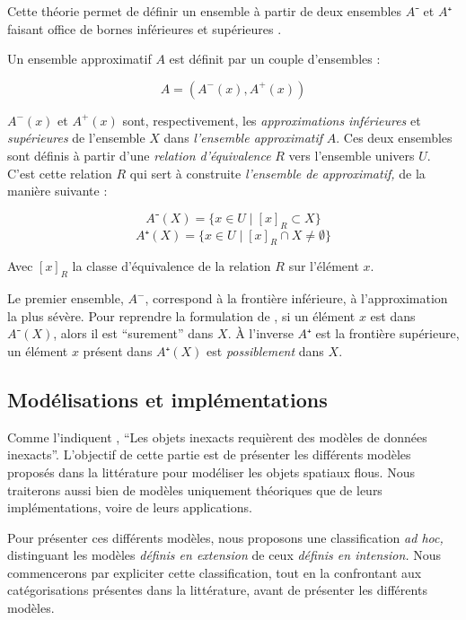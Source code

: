 Cette théorie permet de définir un ensemble à partir de deux ensembles
$A⁻$ et $A⁺$ faisant office de bornes inférieures et supérieures
\autocite{Gacogne1997}.

Un ensemble approximatif $A$ est définit par un couple d'ensembles :

\begin{equation}
  A = (A^-(x),A^+(x))  
\end{equation}

$A^-(x)$ et $A^+(x)$ sont, respectivement, les \emph{approximations}
\emph{inférieures} et \emph{supérieures} de l'ensemble $X$ dans
\emph{l'ensemble approximatif} $A$. Ces deux ensembles sont définis à
partir d'une \emph{relation d'équivalence} $R$ vers l'ensemble univers
$U$. C'est cette relation $R$ qui sert à construite \emph{l'ensemble
  de approximatif,} de la manière suivante :

\begin{equation}
  A⁻(X) = \{ x ∈ U ∣ [x]_R ⊂ X \}
\end{equation}
%
\begin{equation}
  A⁺(X) = \{ x ∈ U ∣ [x]_R ∩ X ≠ ∅ \}
\end{equation}

Avec $[x]_R$ la classe d'équivalence de la relation $R$ sur l'élément
$x$.

Le premier ensemble, $A^-$, correspond à la frontière inférieure, à
l'approximation la plus sévère. Pour reprendre la formulation de
\textcite{Pawlak1982}, si un élément $x$ est dans $A⁻(X)$, alors il
est \enquote{surement} dans $X$. À l'inverse $A⁺$ est la frontière
supérieure, un élément $x$ présent dans $A⁺(X)$ est
\emph{possiblement} dans $X$.


\subsection{Modélisations et implémentations}

Comme l’indiquent \textcite[15]{Burrough1996}, \enquote{Les objets
  inexacts requièrent des modèles de données inexacts}. L’objectif de
cette partie est de présenter les différents modèles proposés dans la
littérature pour modéliser les objets spatiaux flous. Nous traiterons
aussi bien de modèles uniquement théoriques que de leurs
implémentations, voire de leurs applications.

Pour présenter ces différents modèles, nous proposons une
classification \emph{ad hoc,} distinguant les modèles \emph{définis en
  extension} de ceux \emph{définis en intension.} Nous commencerons
par expliciter cette classification, tout en la confrontant aux
catégorisations présentes dans la littérature, avant de présenter les
différents modèles.

